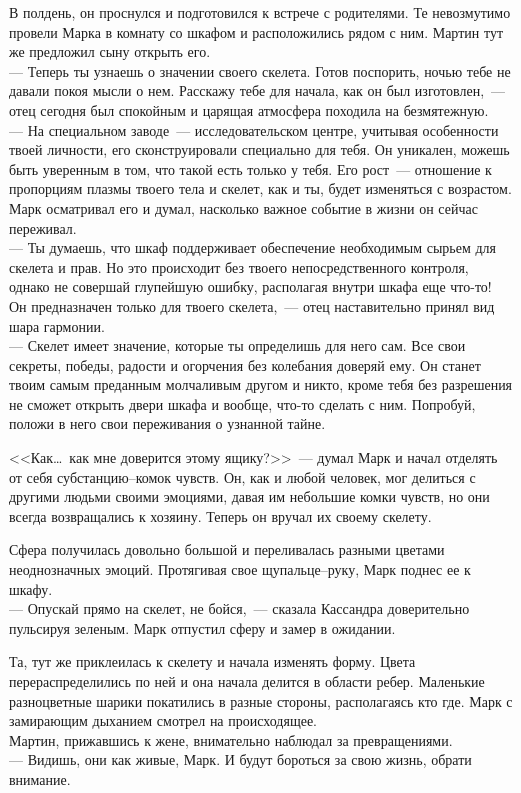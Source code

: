\newpage

В полдень, он проснулся и подготовился к встрече с родителями. Те невозмутимо 
провели Марка в комнату со шкафом и расположились рядом с ним. Мартин тут же 
предложил сыну открыть его.\\
--- Теперь ты узнаешь о значении своего скелета. Готов поспорить, ночью тебе не 
давали покоя мысли о нем. Расскажу тебе для начала, как он был 
изготовлен,~--- отец сегодня был спокойным и царящая атмосфера походила на 
безмятежную.\\
--- На специальном заводе~--- исследовательском центре, учитывая особенности 
твоей личности, его сконструировали специально для тебя. Он уникален, можешь 
быть уверенным в том, что такой есть только у тебя. Его рост~--- отношение к 
пропорциям плазмы твоего тела и скелет, как и ты, будет изменяться с возрастом.
Марк осматривал его и думал, насколько важное событие в жизни он сейчас 
переживал.\\
--- Ты думаешь, что шкаф поддерживает обеспечение необходимым сырьем для 
скелета и прав. Но это происходит без твоего непосредственного контроля, однако 
не совершай глупейшую ошибку, располагая внутри шкафа еще что-то! Он 
предназначен только для твоего скелета,~--- отец наставительно принял вид 
шара гармонии.\\
--- Скелет имеет значение, которые ты определишь для него сам. Все свои 
секреты, победы, радости и огорчения без колебания доверяй ему. Он станет твоим 
самым преданным молчаливым другом и никто, кроме тебя без разрешения не сможет 
открыть двери шкафа и вообще, что-то сделать с ним. Попробуй, положи в него 
свои переживания о узнанной тайне.


<<Как\ldots\ как мне доверится этому ящику?>>~--- думал Марк и начал отделять 
от себя субстанцию--комок чувств. Он, как и любой человек, мог делиться с 
другими людьми своими эмоциями, давая им небольшие комки чувств, но они всегда 
возвращались к хозяину. Теперь он вручал их своему скелету.

Сфера получилась довольно большой и переливалась разными цветами неоднозначных 
эмоций. Протягивая свое щупальце--руку, Марк поднес ее к шкафу.\\
--- Опускай прямо на скелет, не бойся,~--- сказала Кассандра доверительно 
пульсируя зеленым. Марк отпустил сферу и замер в ожидании.

Та, тут же приклеилась к скелету и начала изменять форму. Цвета 
перераспределились по ней и она начала делится в области ребер. Маленькие 
разноцветные шарики покатились в разные стороны, располагаясь кто где. Марк с 
замирающим дыханием смотрел на происходящее.\\
Мартин, прижавшись к жене, внимательно наблюдал за превращениями.\\
--- Видишь, они как живые, Марк. И будут бороться за свою жизнь, обрати 
внимание.

